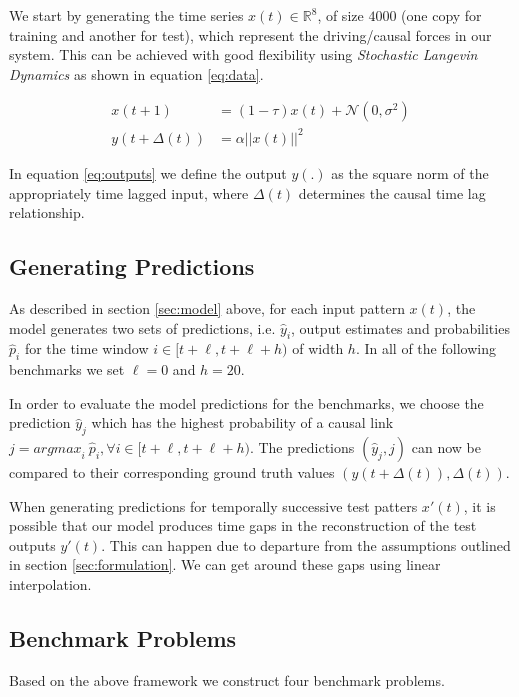 \documentclass[twoside]{article}
\begin{document}
We start by generating the time series $x(t) \in \mathbb{R}^8$, of size $4000$ (one copy for training and another for test), which represent the driving/causal forces in our system. This can be achieved with good flexibility using \emph{Stochastic Langevin Dynamics} as shown in equation \ref{eq:data}.

\begin{align}
 x(t+1) &= (1 - \tau) x(t) + \mathcal{N}(0, \sigma^2) \label{eq:data}\\
 y(t+\Delta(t)) &= \alpha ||x(t)||^2 \label{eq:outputs}
\end{align}

In equation \ref{eq:outputs} we define the output $y(.)$ as the square norm of the appropriately time lagged input, where $\Delta(t)$ determines the causal time lag relationship.

\subsection{Generating Predictions}

As described in section \ref{sec:model} above, for each input pattern $x(t)$, the model generates two sets of predictions, i.e. ${\hat{y}_i}$, output estimates and probabilities $\hat{p}_i$ for the time window $i \in [t+\ell, t+\ell+h)$ of width $h$. In all of the following benchmarks we set $\ell = 0$ and $h = 20$.

In order to evaluate the model predictions for the benchmarks, we choose the prediction $\hat{y}_j$ which has the highest probability of a causal link $j = {argmax}_{i} \ \hat{p}_i, \forall i \in [t+\ell, t+\ell+h)$. The predictions $(\hat{y}_j, j)$ can now be compared to their corresponding ground truth values $(y(t + \Delta(t)), \Delta(t))$. 

When generating predictions for temporally successive test patters $x'(t)$, it is possible that our model produces time gaps in the reconstruction of the test outputs $y'(t)$. This can happen due to departure from the assumptions outlined in section \ref{sec:formulation}. We can get around these gaps using linear interpolation.


\subsection{Benchmark Problems}\label{sec:benchmark}

Based on the above framework we construct four benchmark problems.
\end{document}
